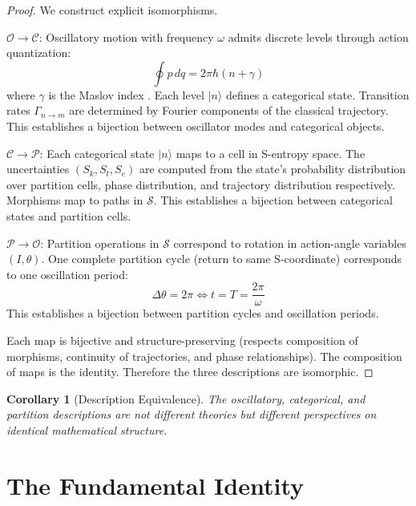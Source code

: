 \documentclass[10pt,twocolumn]{article}
\theoremstyle{plain}
\newtheorem{corollary}[theorem]{Corollary}
\theoremstyle{definition}
\theoremstyle{remark}
\newcommand{\Sspace}{\mathcal{S}}
\newcommand{\Sk}{S_k}
\newcommand{\St}{S_t}
\newcommand{\Se}{S_e}
\newcommand{\Pcat}{\mathcal{P}}
\newcommand{\Ocat}{\mathcal{O}}
\newcommand{\Ccat}{\mathcal{C}}
\begin{document}
\begin{proof}
We construct explicit isomorphisms.

\textbf{$\Ocat \to \Ccat$}: Oscillatory motion with frequency $\omega$ admits discrete levels through action quantization:
\begin{equation}
\oint p \, dq = 2\pi\hbar(n + \gamma)
\end{equation}
where $\gamma$ is the Maslov index \citep{maslov1981}. Each level $|n\rangle$ defines a categorical state. Transition rates $\Gamma_{n \to m}$ are determined by Fourier components of the classical trajectory. This establishes a bijection between oscillator modes and categorical objects.

\textbf{$\Ccat \to \Pcat$}: Each categorical state $|n\rangle$ maps to a cell in S-entropy space. The uncertainties $(\Sk, \St, \Se)$ are computed from the state's probability distribution over partition cells, phase distribution, and trajectory distribution respectively. Morphisms map to paths in $\Sspace$. This establishes a bijection between categorical states and partition cells.

\textbf{$\Pcat \to \Ocat$}: Partition operations in $\Sspace$ correspond to rotation in action-angle variables $(I, \theta)$. One complete partition cycle (return to same S-coordinate) corresponds to one oscillation period:
\begin{equation}
\Delta\theta = 2\pi \iff t = T = \frac{2\pi}{\omega}
\end{equation}
This establishes a bijection between partition cycles and oscillation periods.

Each map is bijective and structure-preserving (respects composition of morphisms, continuity of trajectories, and phase relationships). The composition of maps is the identity. Therefore the three descriptions are isomorphic.
\end{proof}

\begin{corollary}[Description Equivalence]
\label{cor:description}
The oscillatory, categorical, and partition descriptions are not different theories but different perspectives on identical mathematical structure.
\end{corollary}

\section{The Fundamental Identity}
\label{sec:identity}
\end{document}
